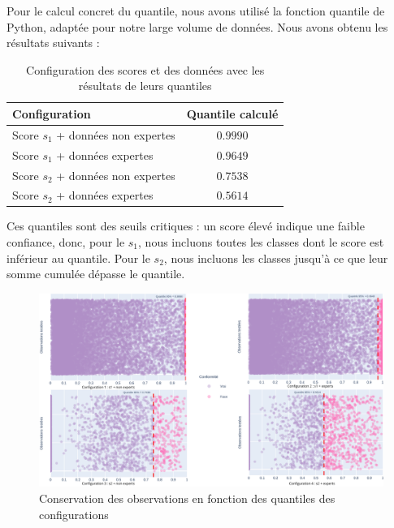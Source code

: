 \documentclass[a4paper,12pt]{article}
\begin{document}
\vspace{0.2cm}

Pour le calcul concret du quantile, nous avons utilisé la fonction quantile de Python, adaptée pour notre large volume de données. Nous avons obtenu les résultats suivants : 

\begin{table}[H]
\centering
    \begin{tabular}{|l|c|}
        \hline
        \textbf{Configuration} & \textbf{Quantile calculé} \\
        \hline
        Score $s_1$ + données non expertes & $0.9990$ \\
        Score $s_1$ + données expertes & $0.9649$ \\
        Score $s_2$ + données non expertes & $0.7538$ \\
        Score $s_2$ + données expertes & $0.5614$ \\
        \hline
        \end{tabular}
    \caption{Configuration des scores et des données avec les résultats de leurs quantiles}
    \label{tab: scores et quantiles}
\end{table}

\vspace{0.2cm}

Ces quantiles sont des seuils critiques : un score élevé indique une faible confiance, donc, pour le $s_1$, nous incluons toutes les classes dont le score est inférieur au quantile. Pour le $s_2$, nous incluons les classes jusqu'à ce que leur somme cumulée dépasse le quantile.

\begin{figure}[H]
    \centering
        \includegraphics[width=1\linewidth]{images/quantiles.png}
    \caption{Conservation des observations en fonction des quantiles des configurations}
    \label{fig:quantiles}
\end{figure}
\end{document}
